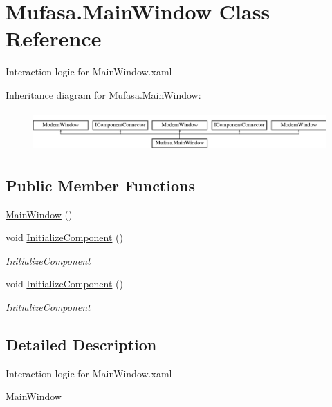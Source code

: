 \hypertarget{class_mufasa_1_1_main_window}{\section{Mufasa.\+Main\+Window Class Reference}
\label{class_mufasa_1_1_main_window}
}


Interaction logic for Main\+Window.\+xaml  


Inheritance diagram for Mufasa.\+Main\+Window\+:\begin{figure}[H]
\begin{center}
\leavevmode
\includegraphics[height=1.544828cm]{class_mufasa_1_1_main_window}
\end{center}
\end{figure}
\subsection*{Public Member Functions}
\begin{DoxyCompactItemize}
\item 
\hyperlink{class_mufasa_1_1_main_window_afea7727fa66912c6a590a0a631de1586}{Main\+Window} ()
\item 
void \hyperlink{class_mufasa_1_1_main_window_aa80bd3c2337c0a5d6e25fab789f54734}{Initialize\+Component} ()
\begin{DoxyCompactList}\small\item\em Initialize\+Component \end{DoxyCompactList}\item 
void \hyperlink{class_mufasa_1_1_main_window_aa80bd3c2337c0a5d6e25fab789f54734}{Initialize\+Component} ()
\begin{DoxyCompactList}\small\item\em Initialize\+Component \end{DoxyCompactList}\end{DoxyCompactItemize}


\subsection{Detailed Description}
Interaction logic for Main\+Window.\+xaml 

\hyperlink{class_mufasa_1_1_main_window}{Main\+Window} 

